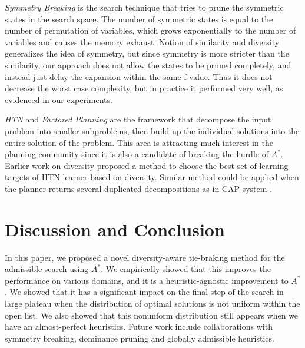 \emph{Symmetry Breaking} \cite{Fox1998,pochter2011exploiting,domshlak2013symmetry} is the search technique that tries to prune the symmetric states in the search space. The number of symmetric states is equal to the number of permutation of variables, which grows exponentially to the number of variables and causes the memory exhaust. Notion of similarity and diversity generalizes the idea of symmetry, but since symmetry is more stricter than the similarity, our approach does not allow the states to be pruned completely, and instead just delay the expansion within the same f-value. Thus it does not decrease the worst case complexity, but in practice it performed very well, as evidenced in our experiments.

\emph{HTN} \cite{erol1994} and \emph{Factored Planning} \cite{amir2003factored,brafman2006factored,Asai2015} are the framework that decompose the input problem into smaller subproblems, then build up the individual solutions into the entire solution of the problem. This area is attracting much interest in the planning community since it is also a candidate of breaking the hurdle of $A^*$. Earlier work on diversity \cite{goldman2015measuring} proposed a method to choose the best set of learning targets of HTN learner based on diversity. Similar method could be applied when the planner returns several duplicated decompositions as in CAP system \cite{Asai2015}.


\section{Discussion and Conclusion}

In this paper, we proposed a novel diversity-aware tie-braking method for the admissible search using $A^*$. We empirically showed that this improves the performance on various domains, and it is a heuristic-agnostic improvement to $A^*$. We showed that it has a significant impact on the final step of the search in large plateau when the distribution of optimal solutions is not uniform within the open list. We also showed that this nonunform distribution still appears when we have an almost-perfect heuristics. Future work include collaborations with symmetry breaking, dominance pruning and globally admissible heuristics.
